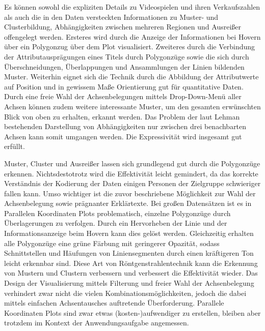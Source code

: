 \documentclass[usegeometry=true]{scrartcl}
\begin{document}
Es können sowohl die expliziten Details zu Videospielen und ihren Verkaufszahlen als auch die in den Daten versteckten Informationen zu Muster- und Clusterbildung, Abhängigkeiten zwischen mehreren Regionen und Ausreißer offengelegt werden.
Ersteres wird durch die Anzeige der Informationen bei Hovern über ein Polygonzug über dem Plot visualisiert. 
Zweiteres durch die Verbindung der Attributausprägungen eines Titels durch Polygonzüge sowie die sich durch Überschneidungen, Überlappungen und Ansammlungen der Linien bildenden Muster. 
Weiterhin eignet sich die Technik durch die Abbildung der Attributwerte auf Position und in gewissem Maße Orientierung gut für quantitative Daten.\cite{Bertin.1982}
Durch eine freie Wahl der Achsenbelegungen mittels Drop-Down-Menü aller Achsen können zudem weitere interessante Muster, um den gesamten erwünschten Blick von oben zu erhalten, erkannt werden. 
Das Problem der laut Lehman bestehenden Darstellung von Abhängigkeiten nur zwischen drei benachbarten Achsen kann somit umgangen werden.\cite[594]{Lehmann.2010}
Die Expressivität wird insgesamt gut erfüllt.

Muster, Cluster und Ausreißer lassen sich grundlegend gut durch die Polygonzüge erkennen. 
Nichtsdestotrotz wird die Effektivität leicht gemindert, da das korrekte Verständnis der Kodierung der Daten einigen Personen der Zielgruppe schwieriger fallen kann.
Umso wichtiger ist die zuvor beschriebene Möglichkeit zur Wahl der Achsenbelegung sowie prägnanter Erklärtexte.
Bei großen Datensätzen ist es in Parallelen Koordinaten Plots problematisch, einzelne Polygonzüge durch Überlagerungen zu verfolgen.
Durch ein Hervorheben der Linie und der Informationsanzeige beim Hovern kann dies gelöst werden. 
Gleichzeitig erhalten alle Polygonzüge eine grüne Färbung mit geringerer Opazität, sodass Schnittstellen und Häufungen von Liniensegmenten durch einen kräftigeren Ton leicht erkennbar sind. 
Diese Art von Röntgenstrahlentechnik kann die Erkennung von Mustern und Clustern verbessern und verbessert die Effektivität wieder.
Das Design der Visualisierung mittels Filterung und freier Wahl der Achsenbelegung verhindert zwar nicht die vielen Kombinationsmöglichkeiten, jedoch die dabei mittels einfachen Achsentausches auftretende Überforderung.
Parallele Koordinaten Plots sind zwar etwas (kosten-)aufwendiger zu erstellen, bleiben aber trotzdem im Kontext der Anwendungsaufgabe angemessen.
\end{document}
